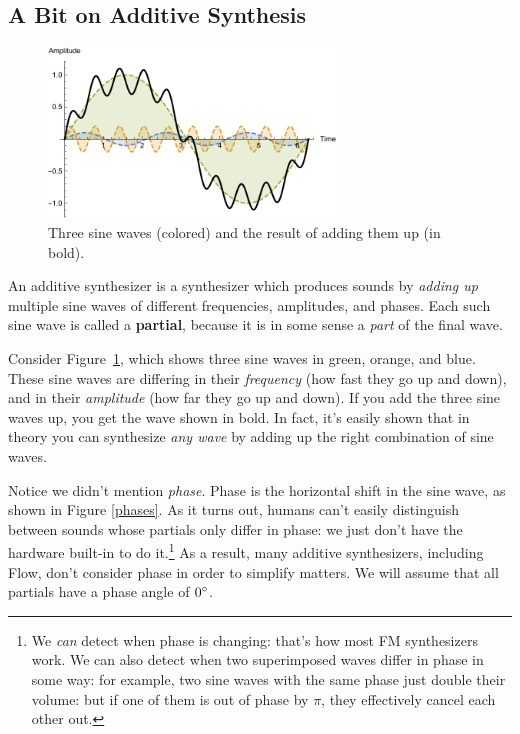 \documentclass{article}
\newcommand\name{Flow}
\begin{document}
\subsection{A Bit on Additive Synthesis}  
\label{additivesynthesis}

\begin{figure}
\vspace{-1em}
\includegraphics[width=3in]{sinewaves}
\caption{Three sine waves (colored) and the result of adding them up (in bold).}
\label{sinewaves}
\vspace{-1em}
\end{figure}

An additive synthesizer is a synthesizer which produces sounds by {\it adding up} multiple sine waves of different frequencies, amplitudes, and phases.  Each such sine wave is called a {\bf partial}, because it is in some sense a {\it part} of the final wave.

Consider Figure~\ref{sinewaves}, which shows three sine waves in green, orange, and blue.  These sine waves are differing in their {\it frequency} (how fast they go up and down), and in their {\it amplitude} (how far they go up and down).  If you add the three sine waves up, you get the wave shown in bold.  In fact, it's easily shown that in theory you can synthesize {\it any wave} by adding up the right combination of sine waves.

Notice we didn't mention {\it phase}.  Phase is the horizontal shift in the sine wave, as shown in Figure \ref{phases}.  As it turns out, humans can't easily distinguish between sounds whose partials only differ in phase: we just don't have the hardware built-in to do it.\footnote{We {\it can} detect when phase is changing: that's how most FM synthesizers work.  We can also detect when two superimposed waves differ in phase in some way: for example, two sine waves with the same phase just double their volume: but if one of them is out of phase by \(\pi\), they effectively cancel each other out.}   As a result,  many additive synthesizers, including {\name}, don't consider phase in order to simplify matters.  We will assume that all partials have a phase angle of \(0\degree\).
\end{document}
